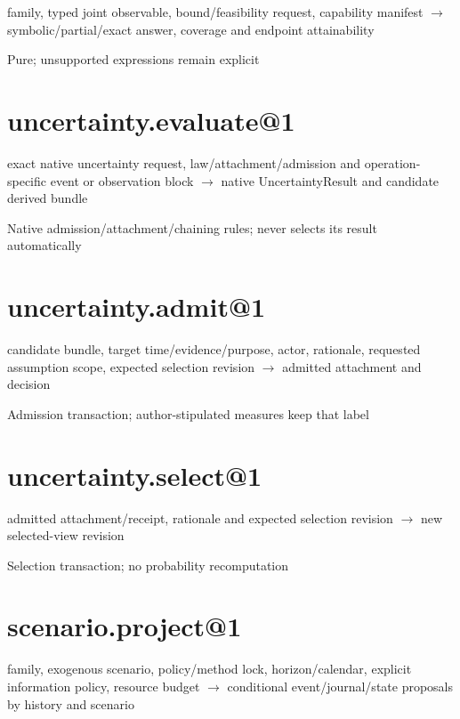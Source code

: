 family, typed joint observable, bound/feasibility request, capability manifest \ensuremath{\rightarrow} symbolic/partial/exact answer, coverage and endpoint attainability

Pure; unsupported expressions remain explicit

\hypertarget{uncertainty.evaluate1}{%
\section{uncertainty.evaluate@1}\label{uncertainty.evaluate1}}

exact native uncertainty request, law/attachment/admission and operation-specific event or observation block \ensuremath{\rightarrow} native UncertaintyResult and candidate derived bundle

Native admission/attachment/chaining rules; never selects its result automatically

\hypertarget{uncertainty.admit1}{%
\section{uncertainty.admit@1}\label{uncertainty.admit1}}

candidate bundle, target time/evidence/purpose, actor, rationale, requested assumption scope, expected selection revision \ensuremath{\rightarrow} admitted attachment and decision

Admission transaction; author-stipulated measures keep that label

\hypertarget{uncertainty.select1}{%
\section{uncertainty.select@1}\label{uncertainty.select1}}

admitted attachment/receipt, rationale and expected selection revision \ensuremath{\rightarrow} new selected-view revision

Selection transaction; no probability recomputation

\hypertarget{scenario.project1}{%
\section{scenario.project@1}\label{scenario.project1}}

family, exogenous scenario, policy/method lock, horizon/calendar, explicit information policy, resource budget \ensuremath{\rightarrow} conditional event/journal/state proposals by history and scenario

